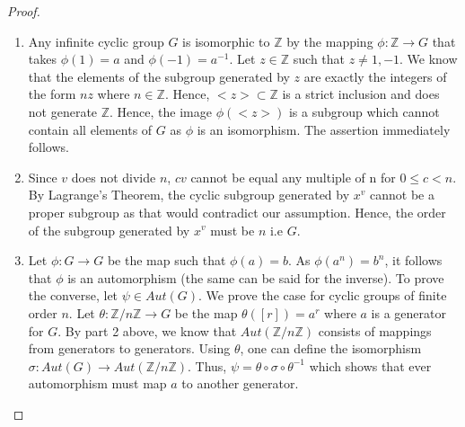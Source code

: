 \documentclass[main.tex]{subfiles}
\begin{document}
\begin{proof}
\begin{enumerate}
\item Any infinite cyclic group $G$ is isomorphic to $\mathbb{Z}$ by the mapping $\phi: \mathbb{Z} \rightarrow G$ that takes $\phi(1) = a$ and $\phi(-1) = a^{-1}$. Let $z \in \mathbb{Z}$ such that $z \neq 1,-1$. We know that the elements of the  subgroup generated by $z$ are exactly the integers of the form $nz$ where $n \in \mathbb{Z}$. Hence, $<z> \subset \mathbb{Z}$ is a strict inclusion and does not generate $\mathbb{Z}$. Hence, the image $\phi(<z>)$ is a subgroup which cannot contain all elements of $G$ as $\phi$ is an isomorphism. The assertion immediately follows.

\item  Since $v$ does not divide $n$,  $cv$ cannot be equal any multiple of n for $ 0 \leq c < n$. By Lagrange's Theorem, the cyclic subgroup generated by $x^v$ cannot be a proper subgroup as that would contradict our assumption. Hence, the order of the subgroup generated by $x^v$ must be $n$ i.e $G$.

\item Let $\phi: G \rightarrow G$ be the map such that $\phi(a) = b$. As $\phi(a^n) = b^n$, it follows that $\phi$ is an automorphism (the same can be said for the inverse). To prove the converse, let $\psi \in Aut(G)$. We prove the case for cyclic groups of finite order $n$. Let $\theta: \mathbb{Z}/n\mathbb{Z} \rightarrow G$ be the map $\theta([r]) = a^r$ where $a$ is a generator for $G$. By part 2 above, we know that $Aut(\mathbb{Z}/n\mathbb{Z})$ consists of mappings from generators to generators. Using $\theta$, one can define the isomorphism $\sigma:  Aut(G) \rightarrow Aut(\mathbb{Z}/n\mathbb{Z})$. Thus, 
$\psi = \theta \circ \sigma \circ \theta^{-1}$ which shows that ever automorphism must map $a$ to another generator. 
\end{enumerate}
\end{proof}
\end{document}
